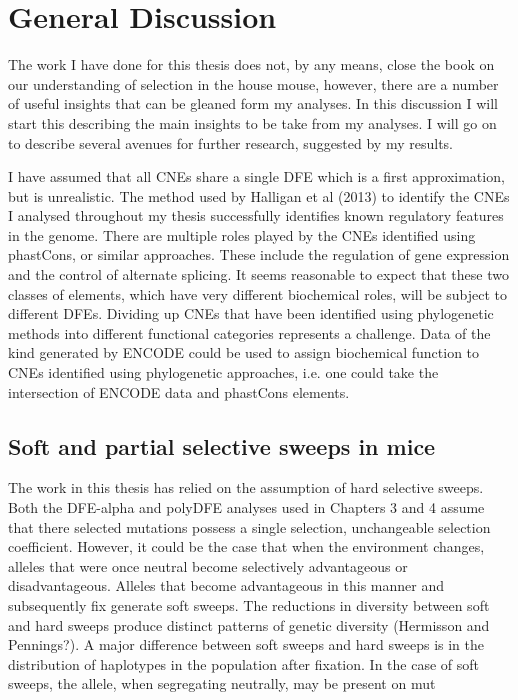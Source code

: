 \chapter{General Discussion}

The work I have done for this thesis does not, by any means, close the book on our understanding of selection in the house mouse, however, there are a number of useful insights that can be gleaned form my analyses. In this discussion I will start this describing the main insights to be take from my analyses. I will go on to describe several avenues for further research, suggested by my results. 

I have assumed that all CNEs share a single DFE which is a first approximation, but is unrealistic. The method used by Halligan et al (2013) to identify the CNEs I analysed throughout my thesis successfully identifies known regulatory features in the genome. There are multiple roles played by the CNEs identified using phastCons, or similar approaches. These include the regulation of gene expression and the control of alternate splicing. It seems reasonable to expect that these two classes of elements, which have very different biochemical roles, will be subject to different DFEs. Dividing up CNEs that have been identified using phylogenetic methods into different functional categories represents a challenge. Data of the kind generated by ENCODE could be used to assign biochemical function to CNEs identified using phylogenetic approaches, i.e. one could take the intersection of ENCODE data and phastCons elements.

\section{Soft and partial selective sweeps in mice}

	The work in this thesis has relied on the assumption of hard selective sweeps. Both the DFE-alpha and polyDFE analyses used in Chapters 3 and 4 assume that there selected mutations possess a single selection, unchangeable selection coefficient. However, it could be the case that when the environment changes, alleles that were once neutral become selectively advantageous or disadvantageous. Alleles that become advantageous in this manner and subsequently fix generate soft sweeps. The reductions in diversity between soft and hard sweeps produce distinct patterns of genetic diversity (Hermisson and Pennings?). 
	A major difference between soft sweeps and hard sweeps is in the distribution of haplotypes in the population after fixation. In the case of soft sweeps, the allele, when segregating neutrally, may be present on mut
	
